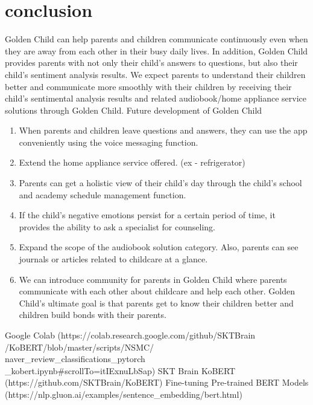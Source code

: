 \documentclass[conference]{IEEEtran}
\begin{document}
\section{conclusion}
Golden Child can help parents and children communicate continuously even when they are away from each other in their busy daily lives. In addition, Golden Child provides parents with not only their child's answers to questions, but also their child's sentiment analysis results. We expect parents to understand their children better and communicate more smoothly with their children by receiving their child's sentimental analysis results and related audiobook/home appliance service solutions through Golden Child. \hfill\break \hfill\break
Future development of Golden Child
\hfill\break
\begin{enumerate}
    \item When parents and children leave questions and answers, they can use the app conveniently using the voice messaging function.
    \hfill\break
    \item Extend the home appliance service offered. (ex - refrigerator)
    \hfill\break
    \item Parents can get a holistic view of their child's day through the child's school and academy schedule management function.
    \hfill\break
    \item If the child's negative emotions persist for a certain period of time, it provides the ability to ask a specialist for counseling.
    \hfill\break
    \item Expand the scope of the audiobook solution category. Also, parents can see journals or articles related to childcare at a glance.
    \hfill\break
    \item We can introduce community for parents in Golden Child where parents communicate with each other about childcare and help each other. \hfill\break
    \hfill\break Golden Child's ultimate goal is that parents get to know their children better and  children build bonds with their parents.
\end{enumerate}

\clearpage
\begin{thebibliography}{00}

 Google Colab (https://colab.research.google.com/github/SKTBrain\\/KoBERT/blob/master/scripts/NSMC/\\naver\_review\_classifications\_pytorch\\\_kobert.ipynb\#scrollTo=itIExnuLbSap)
 SKT Brain KoBERT (https://github.com/SKTBrain/KoBERT)
 Fine-tuning Pre-trained BERT Models\\ (https://nlp.gluon.ai/examples/sentence\_embedding/bert.html)
\end{thebibliography}

    
\end{document}
